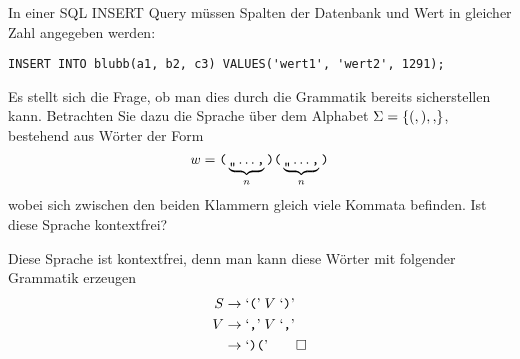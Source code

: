 In einer SQL INSERT Query müssen Spalten der Datenbank und Wert
in gleicher Zahl angegeben werden:
\begin{verbatim}
INSERT INTO blubb(a1, b2, c3) VALUES('wert1', 'wert2', 1291);
\end{verbatim}
Es stellt sich die Frage, ob man dies durch die Grammatik bereits
sicherstellen kann.
Betrachten Sie dazu die Sprache über dem Alphabet 
$\Sigma= \{ {\tt (}, {\tt )}, {\tt ,}\}$, bestehend aus Wörter der
Form
\[
w=
\text{\tt (}\underbrace{\text{\tt ,,}\dots\text{\tt ,}}_{n}
\text{\tt)(}\underbrace{\text{\tt,,}\dots\text{\tt ,}}_{n}\text{\tt )}
\]
wobei sich zwischen den beiden Klammern gleich viele Kommata befinden.
Ist diese Sprache kontextfrei?


\begin{loesung}
Diese Sprache ist kontextfrei, denn man kann diese Wörter mit folgender
Grammatik erzeugen
\begin{align*}
S&\rightarrow \text{`{\tt (}'}\; V \; \text{`{\tt )}'}\\
V&\rightarrow \text{`{\tt ,}'}\; V \; \text{`{\tt ,}'}\\
 &\rightarrow \text{`{\tt )(}'}
\qedhere
\end{align*}
\end{loesung}

